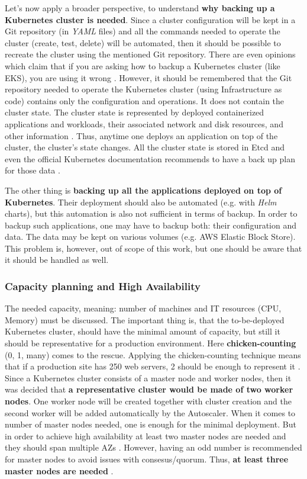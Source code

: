 Let's now apply a broader perspective, to understand \textbf{why backing up a Kubernetes cluster is needed}. Since a cluster configuration will be kept in a Git repository (in \textit{YAML} files) and all the commands needed to operate the cluster (create, test, delete) will be automated, then it should be possible to recreate the cluster using the mentioned Git repository. There are even opinions which claim that if you are asking how to backup a Kubernetes cluster (like EKS), you are using it wrong \cite{reddit-on-backup}. However, it should be remembered that the Git repository needed to operate the Kubernetes cluster (using Infrastructure as code) contains only the configuration and operations. It does not contain the cluster state. The cluster state is represented by deployed containerized applications and workloads, their associated network and disk resources, and other information \cite{k8s-concepts}. Thus, anytime one deploys an application on top of the cluster, the cluster's state changes. All the cluster state is stored in Etcd and even the official Kubernetes documentation recommends to have a back up plan for those data \cite{k8s-components}.

The other thing is \textbf{backing up all the applications deployed on top of Kubernetes}. Their deployment should also be automated (e.g. with \textit{Helm} charts), but this automation is also not sufficient in terms of backup. In order to backup such applications, one may have to backup both: their configuration and data. The data may be kept on various volumes (e.g. AWS Elastic Block Store). This problem is, however, out of scope of this work, but one should be aware that it should be handled as well.

\subsubsection{Capacity planning and High Availability}
\label{subsection-cp-ha}

The needed capacity, meaning: number of machines and IT resources (CPU, Memory) must be discussed. The important thing is, that the to-be-deployed Kubernetes cluster, should have the minimal amount of capacity, but still it should be representative for a production environment. Here \textbf{chicken-counting} (0, 1, many) comes to the rescue. Applying the chicken-counting technique means that if a production site has 250 web servers, 2 should be enough to represent it \cite{book-cicd}. Since a Kubernetes cluster consists of a master node and worker nodes, then it was decided that \textbf{a representative cluster would be made of two worker nodes}. One worker node will be created together with cluster creation and the second worker will be added automatically by the Autoscaler. When it comes to number of master nodes needed, one is enough for the minimal deployment. But in order to achieve high availability at least two master nodes are needed and they should span multiple AZs \cite{article-aws-architecting}. However, having an odd number is recommended for master nodes to avoid issues with consesus/quorum. Thus, \textbf{at least three master nodes are needed} \cite{online-kops-ha,online-ha-k8s-blog}.

